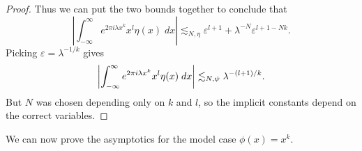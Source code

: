 \begin{proof}
  Thus we can put the two bounds together to conclude that
  \[ \left| \int_{-\infty}^\infty e^{2 \pi i \lambda x^k} x^l \eta(x)\; dx \right| \lesssim_{N,\eta} \varepsilon^{l+1} + \lambda^{-N} \varepsilon^{l+1-Nk}. \]
  Picking $\varepsilon = \lambda^{-1/k}$ gives
  \[ \left| \int_{-\infty}^\infty e^{2 \pi i \lambda x^k} x^l \eta(x)\; dx \right| \lesssim_{N,\psi} \lambda^{-(l+1)/k}. \qedhere \]
  But $N$ was chosen depending only on $k$ and $l$, so the implicit constants depend on the correct variables.
\end{proof}


We can now prove the asymptotics for the model case $\phi(x) = x^k$.

